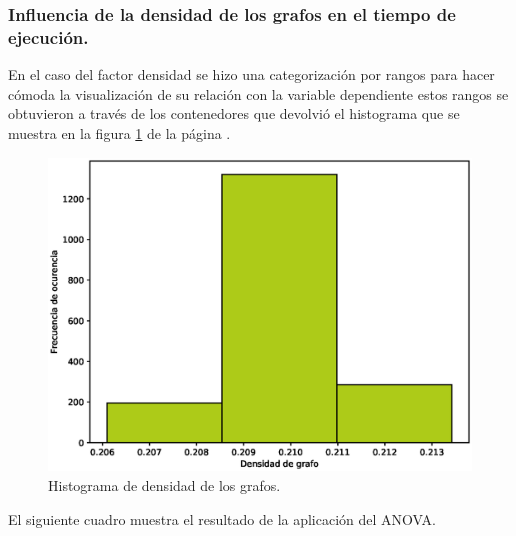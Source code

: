 \documentclass{article}
\begin{document}
\subsubsection{Influencia de la densidad de los grafos en el tiempo de ejecución.}

En el caso del factor densidad se hizo una categorización por rangos para hacer cómoda la visualización de su relación con la variable dependiente estos rangos se obtuvieron a través de los contenedores que devolvió el histograma que se muestra en la figura \ref{fig3} de la página \pageref{fig3}.

\begin{center}
\begin{figure}[ht]
\includegraphics[scale=0.5]{boxplot.eps}
\caption{Histograma de densidad de los grafos.}
\label{fig3}
\end{figure}
\end{center}
El siguiente cuadro muestra el resultado de la aplicación del ANOVA.
\end{document}
